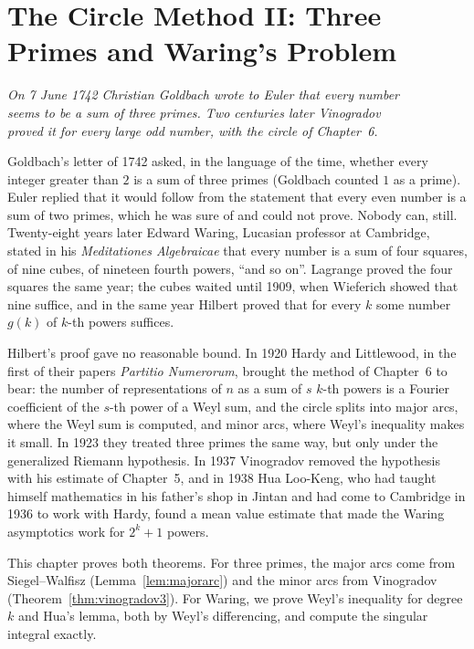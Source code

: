 \chapter{The Circle Method II: Three Primes and Waring's Problem}
\begin{center}\itshape
On 7 June 1742 Christian Goldbach wrote to Euler that every number\\
seems to be a sum of three primes. Two centuries later Vinogradov\\
proved it for every large odd number, with the circle of Chapter~6.
\end{center}

Goldbach's letter of 1742 asked, in the language of the time, whether every integer greater than $2$ is a sum of three primes (Goldbach counted $1$ as a prime). Euler replied that it would follow from the statement that every even number is a sum of two primes, which he was sure of and could not prove. Nobody can, still. Twenty-eight years later Edward Waring, Lucasian professor at Cambridge, stated in his \emph{Meditationes Algebraicae} that every number is a sum of four squares, of nine cubes, of nineteen fourth powers, ``and so on''. Lagrange proved the four squares the same year; the cubes waited until 1909, when Wieferich showed that nine suffice, and in the same year Hilbert proved that for every $k$ some number $g(k)$ of $k$-th powers suffices.

Hilbert's proof gave no reasonable bound. In 1920 Hardy and Littlewood, in the first of their papers \emph{Partitio Numerorum}, brought the method of Chapter~6 to bear: the number of representations of $n$ as a sum of $s$ $k$-th powers is a Fourier coefficient of the $s$-th power of a Weyl sum, and the circle splits into major arcs, where the Weyl sum is computed, and minor arcs, where Weyl's inequality makes it small. In 1923 they treated three primes the same way, but only under the generalized Riemann hypothesis. In 1937 Vinogradov removed the hypothesis with his estimate of Chapter~5, and in 1938 Hua Loo-Keng, who had taught himself mathematics in his father's shop in Jintan and had come to Cambridge in 1936 to work with Hardy, found a mean value estimate that made the Waring asymptotics work for $2^k+1$ powers.

This chapter proves both theorems. For three primes, the major arcs come from Siegel--Walfisz (Lemma~\ref{lem:majorarc}) and the minor arcs from Vinogradov (Theorem~\ref{thm:vinogradov3}). For Waring, we prove Weyl's inequality for degree $k$ and Hua's lemma, both by Weyl's differencing, and compute the singular integral exactly.

